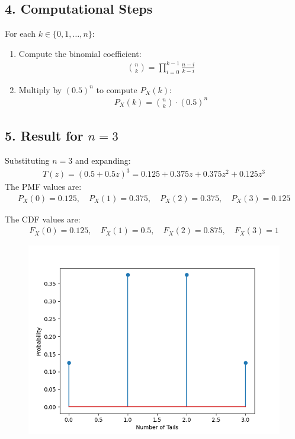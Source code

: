 \documentclass[journal]{IEEEtran}
\begin{document}
\subsection*{4. Computational Steps}
For each \(k \in \{0, 1, \dots, n\}\):
\begin{enumerate}
    \item Compute the binomial coefficient:
    \begin{align}
    \binom{n}{k} = \prod_{i=0}^{k-1} \frac{n-i}{k-i}
    \end{align}
    \item Multiply by \((0.5)^n\) to compute \(P_X(k)\):
    \begin{align}
    P_X(k) = \binom{n}{k} \cdot (0.5)^n
    \end{align}
\end{enumerate}

\subsection*{5. Result for \(n = 3\)}
Substituting \(n = 3\) and expanding:
\begin{align}
T(z) = (0.5 + 0.5z)^3 = 0.125 + 0.375z + 0.375z^2 + 0.125z^3
\end{align}
The PMF values are:
\begin{align}
P_X(0) = 0.125, \quad P_X(1) = 0.375, \quad P_X(2) = 0.375, \quad P_X(3) = 0.125
\end{align}

The CDF values are:
\begin{align}
F_X(0) = 0.125, \quad F_X(1) = 0.5, \quad F_X(2) = 0.875, \quad F_X(3) = 1
\end{align}
	\begin{figure}[h!]
		\centering
		\includegraphics[width=\columnwidth]{figs/fig1.png}
		\label{stemplot}
	\end{figure}
	
\end{document}
